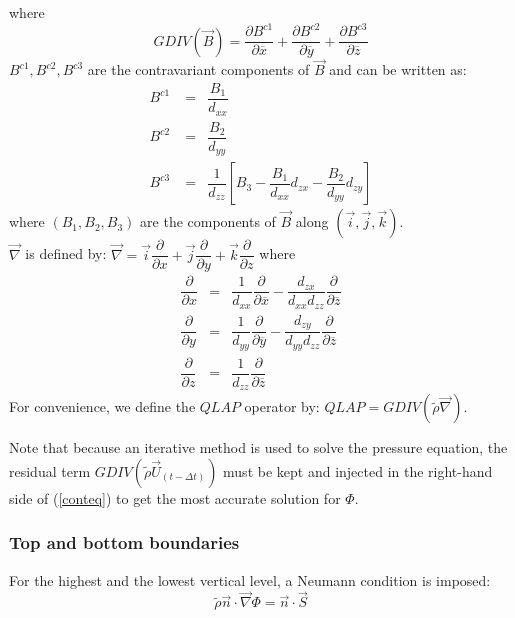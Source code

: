 where
\begin{displaymath}
GDIV(\vec{B}) = \dfrac {\partial{ B^{c1} } } {\partial{\overline{x} } }
               + \dfrac {\partial{ B^{c2} } } {\partial{\overline{y} } }
               + \dfrac {\partial{ B^{c3} } } {\partial{\overline{z} } }
\end{displaymath}
$B^{c1}, B^{c2}, B^{c3}$ are the contravariant components of
$\overrightarrow{B}$ and can be written as:
\begin{eqnarray}
 B^{c1} \;  &  = &
 \dfrac{{B_1}}{ d_{xx}} \\
 B^{c2} \;  &  = &
 \dfrac{{B_2}}{ d_{yy}} \\
 B^{c3} \;  & = &
\dfrac{1}{d_{zz}}
\left[  B_3 -
   \dfrac  {B_1} {d_{xx}}  d_{zx}
-  \dfrac  {B_2} {d_{yy}}  d_{zy}  \right]
\end{eqnarray}
where $(B_1, B_2, B_3)$ are the components of $\vec{B}$ along
$\left( \vec{i}, \vec{j}, \vec{k} \right)$.\\
$\overrightarrow{\nabla}$ is defined by:
$
\overrightarrow{\nabla}=
\vec{i} \dfrac {\partial{  } } {\partial{x} }  +
\vec{j} \dfrac {\partial{  } } {\partial{y} }  +
\vec{k} \dfrac {\partial{  } } {\partial{z} }
$
where
\begin{eqnarray*}
\dfrac {\partial{  } } {\partial{x} } &=&
\dfrac{1}{d_{xx}}
  \dfrac{\partial  }{\partial \overline{x}}- \dfrac{d_{zx}}{d_{xx}d_{zz}}
\dfrac{\partial  }{\partial \overline{z}}\\
\dfrac {\partial{  } } {\partial{y} } &=&
\dfrac{1}{d_{yy}}
  \dfrac{\partial  }{\partial \overline{y}}- \dfrac{d_{zy}}{d_{yy}d_{zz}}
   \dfrac{\partial  }{\partial \overline{z}}\\
\dfrac {\partial{  } } {\partial{z} } &=&
\dfrac{1}{d_{zz}}
  \dfrac{\partial  }{\partial \overline{z}}
\end{eqnarray*}
For convenience, we define the $QLAP$ operator by: $QLAP =
GDIV(\tilde{\rho} \overrightarrow{\nabla})$.

Note that because an iterative method is used to solve the pressure equation,
the residual term $GDIV(\tilde{\rho} \vec{U}_{(t-\Delta t)})$
must be kept and injected in the right-hand side
of (\ref{conteq}) to get the most accurate solution for $\Phi$.
\subsubsection{Top and bottom boundaries}
For the highest and the lowest vertical level, a Neumann condition is
imposed:\\
\begin{equation}
\label{vb1}
\tilde{\rho} \vec{n} \cdot \overrightarrow{\nabla}\Phi= \vec{n} \cdot
\overrightarrow{S}
\end{equation}
